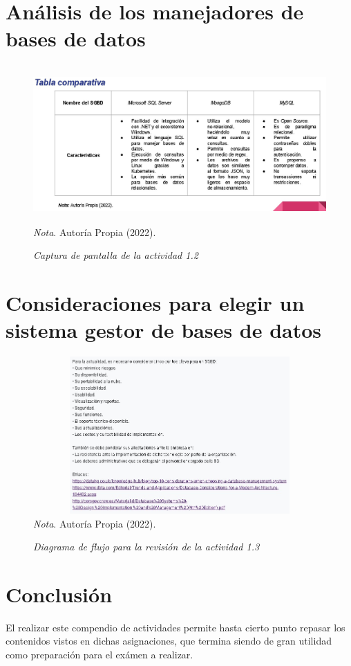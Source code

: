 \documentclass[stu, 12pt, letterpaper, donotrepeattitle, floatsintext, natbib]{apa7}
\begin{document}
\section{Análisis de los manejadores de bases de datos}
\begin{figure}[H]
    \caption{\emph{Captura de pantalla de la actividad 1.2\\}}
    \centering
    \smallskip
    \includegraphics[width=17cm, height=6cm]{act_1.2.jpg}
    \bigskip
    \justifying\small\textit{Nota}. %
    Autoría Propia (2022).
\end{figure}
\vspace{\baselineskip}
\section{Consideraciones para elegir un sistema gestor de bases de datos}
\begin{figure}[H]
    \caption{\emph{Diagrama de flujo para la revisión de la actividad 1.3\\}}
    \centering
    \smallskip
    \includegraphics[width=17cm, height=6cm]{act.jpg}
    \bigskip
    \justifying\small\textit{Nota}. %
    Autoría Propia (2022).
\end{figure}
\section{Conclusión}
    \begin{justifying}
    El realizar este compendio de actividades permite hasta cierto punto repasar los contenidos
    vistos en dichas asignaciones, que termina siendo de gran utilidad como preparación para el exámen a realizar.\par
    \end{justifying}
\end{document}
